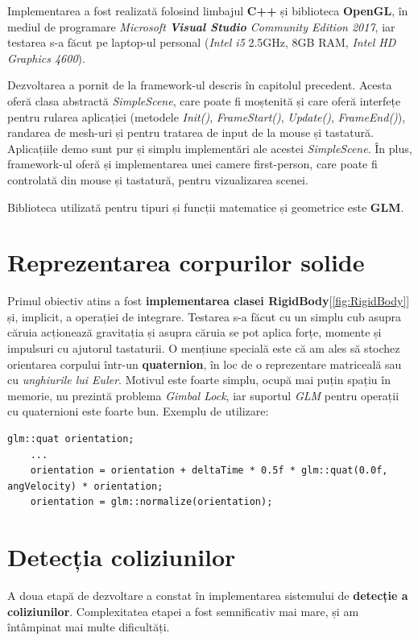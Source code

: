 \documentclass[12pt,a4paper]{report}
\begin{document}
Implementarea a fost realizată folosind limbajul \textbf{C++} și biblioteca \textbf{OpenGL}, în mediul de programare \textit{Microsoft \textbf{Visual Studio} Community Edition 2017}, iar testarea s-a făcut pe laptop-ul personal (\textit{Intel i5} 2.5GHz, 8GB RAM, \textit{Intel HD Graphics 4600}).

Dezvoltarea a pornit de la framework-ul descris în capitolul precedent. Acesta oferă clasa abstractă \textit{SimpleScene}, care poate fi moștenită și care oferă interfețe pentru rularea aplicației (metodele \textit{Init()}, \textit{FrameStart()}, \textit{Update()}, \textit{FrameEnd()}), randarea de mesh-uri și pentru tratarea de input de la mouse și tastatură. Aplicațiile demo sunt pur și simplu implementări ale acestei \textit{SimpleScene}. În plus, framework-ul oferă și implementarea unei camere first-person, care poate fi controlată din mouse și tastatură, pentru vizualizarea scenei.

Biblioteca utilizată pentru tipuri și funcții matematice și geometrice este \textbf{GLM}\cite{glm}.

\section{Reprezentarea corpurilor solide}

Primul obiectiv atins a fost \textbf{implementarea clasei RigidBody}[\autoref{fig:RigidBody}] și, implicit, a operației de integrare. Testarea s-a făcut cu un simplu cub asupra căruia acționează gravitația și asupra căruia se pot aplica forțe, momente și impulsuri cu ajutorul tastaturii. O mențiune specială este că am ales să stochez orientarea corpului într-un \textbf{quaternion}, în loc de o reprezentare matriceală sau cu \textit{unghiurile lui Euler}. Motivul este foarte simplu, ocupă mai puțin spațiu în memorie, nu prezintă problema \textit{Gimbal Lock}\cite{quaternions}, iar suportul \textit{GLM} pentru operații cu quaternioni este foarte bun. Exemplu de utilizare:
\begin{lstlisting}[style=myC++, label = {code:quaternion_example}, caption={actualizarea orientării în pasul de integrare}, float, floatplacement = H]
	glm::quat orientation;
	...
	orientation = orientation + deltaTime * 0.5f * glm::quat(0.0f, angVelocity) * orientation;
	orientation = glm::normalize(orientation);
\end{lstlisting}


\section {Detecția coliziunilor}
A doua etapă de dezvoltare a constat în implementarea sistemului de \textbf{detecție a coliziunilor}. Complexitatea etapei a fost semnificativ mai mare, și am întâmpinat mai multe dificultăți.
\end{document}
